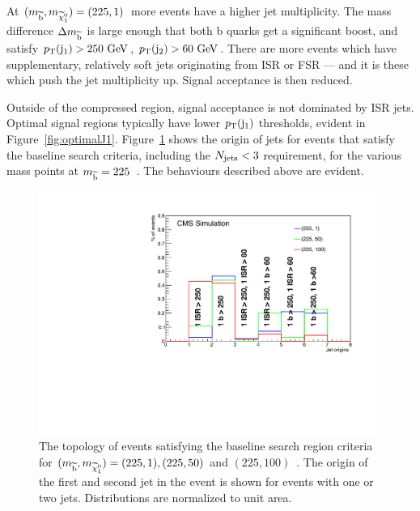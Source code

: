 At $(m_{\widetilde{{\rm b}}},m_{\widetilde{\chi}^{0}_{1}})=(225,1)$~\GeV more events have a higher jet multiplicity. 
The mass difference $\Delta m_{\widetilde{{\rm b}}}$ is large enough that both b quarks get a significant boost, and satisfy $p_{\text{T}}({\rm j}_1)>250~\mathrm{GeV}$, $p_{\text{T}}({\rm j}_2)>60~\mathrm{GeV}$. 
There are more events which have supplementary, relatively soft jets originating from \ac{ISR} or \ac{FSR} --- and it is these which push the jet multiplicity up. 
Signal acceptance is then reduced.

Outside of the compressed region, signal acceptance is not dominated by \ac{ISR} jets. Optimal signal regions typically have lower $p_{\text{T}}({\rm j}_1)$ thresholds, evident in Figure~\ref{fig:optimalJ1}.
Figure~\ref{fig:jetContent225} shows the origin of jets for events that satisfy the baseline search criteria, including the $N_{\text{jets}}<3$ requirement, for the various mass points at $m_{\widetilde{{\rm b}}}=225$~\GeV.
The behaviours described above are evident. 

\begin{figure}[!Hhtb]
  \begin{center}
  \includegraphics[scale=0.39]{Figures/sus13009/eventTypes_225_mod.pdf}
  \caption{The topology of events satisfying the baseline search region criteria for $(m_{\widetilde{{\rm b}}}, m_{\widetilde{\chi}^{0}_{1}})=(225,1), (225,50)$ and $(225,100)$~\GeV. The origin of the first and second jet in the event is shown for events with one or two jets. Distributions are normalized to unit area.}
  \label{fig:jetContent225}
  \end{center}
\end{figure}

